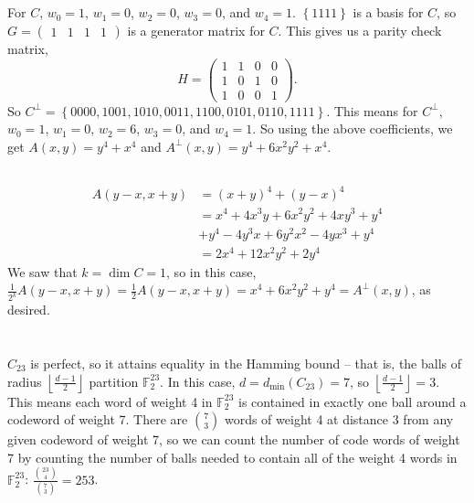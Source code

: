 \documentclass[11pt]{article}
\def\F{\mathbb{F}}
\begin{document}
\subsection{} %
For $C$, $w_0=1$, $w_1=0$, $w_2=0$, $w_3=0$, and $w_4=1$.
$\left\{1111\right\}$ is a basis for $C$, so $G=\begin{pmatrix}1&1&1&1\end{pmatrix}$ is a generator matrix for $C$.
This gives us a parity check matrix,
\[H=\begin{pmatrix}
	1 & 1 & 0 & 0\\
	1 & 0 & 1 & 0\\
	1 & 0 & 0 & 1
\end{pmatrix}.\]
So $C^\perp=\left\{0000,1001,1010,0011,1100,0101,0110,1111\right\}$.
This means for $C^\perp$, $w_0=1$, $w_1=0$, $w_2=6$, $w_3=0$, and $w_4=1$.
So using the above coefficients, we get
\newline
\newline
$A(x,y)=y^4+x^4$
\newline
\newline
and
\newline
\newline
$A^\perp(x,y)=y^4+6x^2y^2+x^4$.


\subsection{} %
\begin{align*}
	A(y-x,x+y)&=(x+y)^4+(y-x)^4\\
			  &=x^4+4x^3y+6x^2y^2+4xy^3+y^4\\
			  &+y^4-4y^3x+6y^2x^2-4yx^3+y^4\\
			  &=2x^4+12x^2y^2+2y^4
\end{align*}
We saw that $k=\dim C=1$, so in this case, $\frac{1}{2^k}A(y-x,x+y)=\frac{1}{2}A(y-x,x+y)=x^4+6x^2y^2+y^4=A^\perp(x,y)$, as desired.


\section{} %
$C_{23}$ is perfect, so it attains equality in the Hamming bound -- that is, the balls of radius $\left\lfloor\frac{d-1}{2}\right\rfloor$ partition $\F_2^{23}$.
In this case, $d=d_\text{min}(C_{23})=7$, so $\left\lfloor\frac{d-1}{2}\right\rfloor=3$.
This means each word of weight 4 in $\F_2^{23}$ is contained in exactly one ball around a codeword of weight 7.
There are $\binom{7}{3}$ words of weight 4 at distance 3 from any given codeword of weight 7, so we can count the number of code words of weight 7 by counting the number of balls needed to contain all of the weight 4 words in $\F_2^{23}$: $\frac{\binom{23}{4}}{\binom{7}{3}}=253$.
\end{document}
